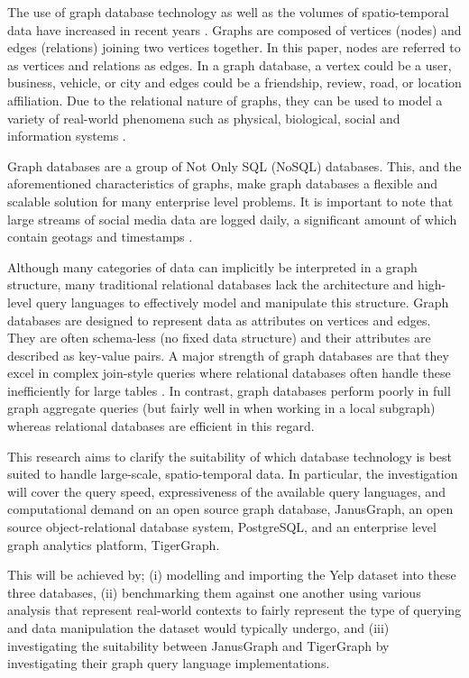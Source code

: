 The use of graph database technology as well as the volumes of spatio-temporal data have increased in recent years \cite{mongovspostgres}. Graphs are composed of vertices (nodes) and edges (relations) joining two vertices together. In this paper, nodes are referred to as vertices and relations as edges. In a graph database, a vertex could be a user, business, vehicle, or city and edges could be a friendship, review, road, or location affiliation. Due to the relational nature of graphs, they can be used to model a variety of real-world phenomena such as physical, biological, social and information systems \cite{socialdata}.

Graph databases are a group of Not Only SQL (NoSQL) databases. This, and the aforementioned characteristics of graphs, make graph databases a flexible and scalable solution for many enterprise level problems. It is important to note that large streams of social media data are logged daily, a significant amount of which contain geotags and timestamps \cite{twitterdata}.

Although many categories of data can implicitly be interpreted in a graph structure, many traditional relational databases lack the architecture and high-level query languages to effectively model and manipulate this structure. Graph databases are designed to represent data as attributes on vertices and edges. They are often schema-less (no fixed data structure) and their attributes are described as key-value pairs. A major strength of graph databases are that they excel in complex join-style queries where relational databases often handle these inefficiently for large tables \cite{data-in-nosql}. In contrast, graph databases perform poorly in full graph aggregate queries (but fairly well in when working in a local subgraph) whereas relational databases are efficient in this regard.

This research aims to clarify the suitability of which database technology is best suited to handle large-scale, spatio-temporal data. In particular, the investigation will cover the query speed, expressiveness of the available query languages, and computational demand on an open source graph database, JanusGraph, an open source object-relational database system, PostgreSQL, and an enterprise level graph analytics platform, TigerGraph.

This will be achieved by; (i) modelling and importing the Yelp dataset \cite{yelpdataset}  into these three databases, (ii) benchmarking them against one another using various analysis that represent real-world contexts to fairly represent the type of querying and data manipulation the dataset would typically undergo, and (iii) investigating the suitability between JanusGraph and TigerGraph by investigating their graph query language implementations.